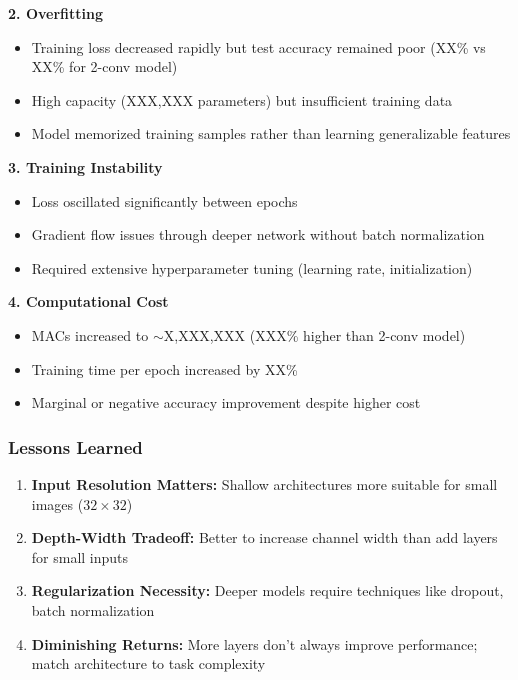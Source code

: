 \documentclass[11pt,a4paper]{article}
\begin{document}
\textbf{2. Overfitting}
\begin{itemize}
    \item Training loss decreased rapidly but test accuracy remained poor (XX\% vs XX\% for 2-conv model)
    \item High capacity (XXX,XXX parameters) but insufficient training data
    \item Model memorized training samples rather than learning generalizable features
\end{itemize}

\textbf{3. Training Instability}
\begin{itemize}
    \item Loss oscillated significantly between epochs
    \item Gradient flow issues through deeper network without batch normalization
    \item Required extensive hyperparameter tuning (learning rate, initialization)
\end{itemize}

\textbf{4. Computational Cost}
\begin{itemize}
    \item MACs increased to $\sim$X,XXX,XXX (XXX\% higher than 2-conv model)
    \item Training time per epoch increased by XX\%
    \item Marginal or negative accuracy improvement despite higher cost
\end{itemize}

\subsubsection{Lessons Learned}

\begin{enumerate}
    \item \textbf{Input Resolution Matters:} Shallow architectures more suitable for small images ($32 \times 32$)
    \item \textbf{Depth-Width Tradeoff:} Better to increase channel width than add layers for small inputs
    \item \textbf{Regularization Necessity:} Deeper models require techniques like dropout, batch normalization
    \item \textbf{Diminishing Returns:} More layers don't always improve performance; match architecture to task complexity
\end{enumerate}
\end{document}
